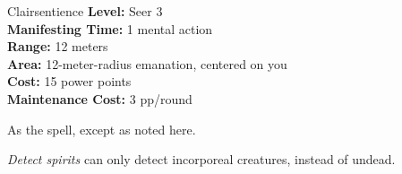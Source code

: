 {Clairsentience}
{
	\textbf{Level:}
	Seer 3\\
	\textbf{Manifesting Time:}
	1 mental action\\
	\textbf{Range:}
	12 meters\\
	\textbf{Area:}
	12-meter-radius emanation, centered on you\\
	\textbf{Cost:}
	15 power points\\
	\textbf{Maintenance Cost:}
	3 pp/round\\
}
{
	As the  spell, except as noted here.

	\emph{Detect spirits} can only detect incorporeal creatures, instead of undead.
}